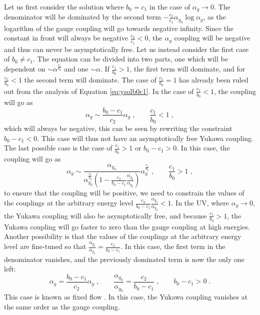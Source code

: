 Let us first consider the solution where $b_0=c_1$ in the case of $\alpha_g\to0$. The denominator will be dominated by the second term  $-\frac{c_2}{c_1}\alpha_{y_0}\log \alpha_g $, as the logarithm of the gauge coupling will go towards negative infinity. Since the constant in front will always be negative $\frac{c_2}{c_1}<0$, the $\alpha_y$ coupling will be negative and thus can never be asymptotically free. 
Let us instead consider the first case of $b_0\neq c_1$. The equation can be divided into two parts, one which will be dependent on $\sim\alpha^{\frac{c_1}{b_0}}$ and one $\sim\alpha$. If $\frac{c_1}{b_0}>1$, the first term will dominate, and for $\frac{c_1}{b_0}<1$ the second term will dominate. The case of $\frac{c_1}{b_0}=1$ has already been ruled out from the analysis of Equation \ref{eq:ysolb0c1}. In the case of $\frac{c_1}{b_0}<1$, the coupling will go as \begin{equation}
    \alpha_y\sim\frac{b_0-c_1}{c_2}\alpha_g\;,\quad\quad \frac{c_1}{b_0}<1\;,
\end{equation}
which will always be negative, this can be seen by rewriting the constraint $b_0-c_1<0$. This case will thus not have an asymptotically free Yukawa coupling. The last possible case is the case of $\frac{c_1}{b_0}>1$ or $b_0-c_1>0$. In this case, the coupling will go as
\begin{equation}
    \alpha_y\sim\frac{\alpha_{y_0}}{ \alpha_{g_0}^{\frac{c_1}{b_0}}\left(1-\frac{c_2}{b_0-c_1}\frac{\alpha_{y_0}}{\alpha_{g_0}}\right)}\alpha_g^{\frac{c_1}{b_0}}\;,\quad\quad \frac{c_1}{b_0}>1\;,
\end{equation}
to ensure that the coupling will be positive, we need to constrain the values of the couplings at the arbitrary energy level $\frac{c_2}{b_0-c_1}\frac{\alpha_{y_0}}{\alpha_{g_0}}<1$. In the UV, where $\alpha_g\to 0$, the Yukawa coupling will also be asymptotically free, and because $\frac{c_1}{b_0}>1$, the Yukawa coupling will go faster to zero than the gauge coupling at high energies. Another possibility is that the values of the couplings at the arbitrary energy level are fine-tuned so that $\frac{\alpha_{g_0}}{\alpha_{y_0}}=\frac{c_2}{b_0-c_1}$. In this case, the first term in the denominator vanishes, and the previously dominated term is now the only one left:
\begin{equation}
    \alpha_y=\frac{b_0-c_1}{ c_2 }\alpha_g\;,\quad\quad \frac{\alpha_{g_0}}{\alpha_{y_0}}=\frac{c_2}{b_0-c_1}\;,\quad\quad b_0-c_1>0\;.\label{eq:ygfixed}
\end{equation}
This case is known as fixed flow \cite{SoftenedGravity}. In this case, the Yukawa coupling vanishes at the same order as the gauge coupling. 


